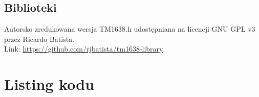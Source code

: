 \documentclass[a4paper,12pt]{article}
\begin{document}
\subsection{Biblioteki}
Autorsko zredukowana wersja TM1638.h udostępniana na licencji GNU GPL v3 przez Ricardo Batista.\\
Link: \href{https://github.com/rjbatista/tm1638-library}{https://github.com/rjbatista/tm1638-library}

\section{Listing kodu}


\end{document}
